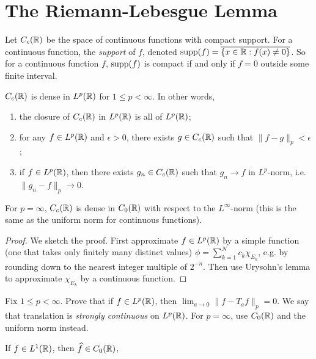 \section{The Riemann-Lebesgue Lemma}
\begin{definition}
  Let $C_c(\mathbb{R})$ be the space of continuous
  functions with compact support. For a continuous function, the \emph{support} of $f$, denoted $\operatorname{supp}(f) = \overline{\{x \in \mathbb{R} : f(x) \ne 0\}}$.
  So for a continuous function $f$,
  $\operatorname{supp}(f)$ is compact if and only if
  $f = 0$ outside some finite interval.
\end{definition}

\begin{theorem}
  $C_c(\mathbb{R})$ is dense in $L^p(\mathbb{R})$
  for $1 \le p < \infty$. In other words,
  \begin{enumerate}
    \item the closure of $C_c(\mathbb{R})$ in $L^p(\mathbb{R})$
      is all of $L^p(\mathbb{R})$;
    \item for any $f \in L^p(\mathbb{R})$
      and $\epsilon > 0$, there
      exists $g \in C_c(\mathbb{R})$ such that
      $\|f - g\|_p < \epsilon$;
    \item if $f \in L^p(\mathbb{R})$, then there
      exists $g_n \in C_c(\mathbb{R})$ such that
      $g_n \to f$ in $L^p$-norm, i.e.
      $\|g_n - f\|_p \to 0$.
  \end{enumerate}
  For $p = \infty$, $C_c(\mathbb{R})$ is
  dense in $C_0(\mathbb{R})$ with respect to
  the $L^\infty$-norm (this is the same
  as the uniform norm for continuous
  functions).
\end{theorem}

\begin{proof}
  We sketch the proof. First approximate
  $f \in L^p(\mathbb{R})$ by a simple
  function (one that takes only finitely
  many distinct values)
  $\phi = \sum_{k = 1}^N c_k \chi_{E_k}$,
  e.g. by rounding down to the nearest
  integer multiple of $2^{-n}$. Then
  use Urysohn's lemma to approximate
  $\chi_{E_k}$ by a continuous function.
\end{proof}

\begin{exercise}
  Fix $1 \le p < \infty$. Prove that
  if $f \in L^p(\mathbb{R})$, then
  $\lim_{a \to 0} \|f - T_a f\|_p = 0$.
  We say that translation is
  \emph{strongly continuous} on $L^p(\mathbb{R})$.
  For $p = \infty$, use
  $C_0(\mathbb{R})$ and the uniform norm instead.
\end{exercise}

\begin{lemma}
  If $f \in L^1(\mathbb{R})$, then
  $\widehat{f} \in C_0(\mathbb{R})$,
\end{lemma}

